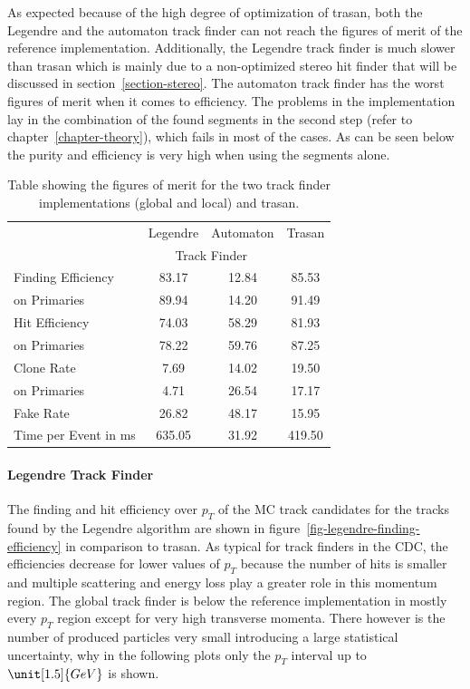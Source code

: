 As expected because of the high degree of optimization of trasan, both the Legendre and the automaton track finder can not reach the figures of merit of the reference implementation. Additionally, the Legendre track finder is much slower than trasan which is mainly due to a non-optimized stereo hit finder that will be discussed in section~\ref{section-stereo}. The automaton track finder has the worst figures of merit when it comes to efficiency. The problems in the implementation lay in the combination of the found segments in the second step (refer to chapter~\ref{chapter-theory}), which fails in most of the cases. As can be seen below the purity and efficiency is very high when using the segments alone.

\begin{table}
  \caption{Table showing the figures of merit for the two track finder implementations (global and local) and trasan.}
  \centering
  \begin{tabular}{lccc} \toprule
    & Legendre & Automaton & Trasan \\ 
    & \multicolumn{2}{c}{Track Finder} & \\ \midrule
    Finding Efficiency & 83.17 & 12.84 & 85.53 \\
    \quad on Primaries & 89.94 & 14.20 & 91.49 \\ 
    Hit Efficiency     & 74.03 & 58.29 & 81.93 \\
    \quad on Primaries & 78.22 & 59.76 & 87.25 \\ 
    Clone Rate         & 7.69  & 14.02 & 19.50 \\
    \quad on Primaries & 4.71  & 26.54 & 17.17 \\ 
    Fake Rate          & 26.82 & 48.17 & 15.95 \\ 
    Time per Event in ms & 635.05 & 31.92 & 419.50 \\ \bottomrule
  \end{tabular}
  \label{tab-old-implementation-results}
\end{table}

\paragraph{Legendre Track Finder}
The finding and hit efficiency over $p_T$ of the MC track candidates for the tracks found by the Legendre algorithm are shown in figure~\ref{fig-legendre-finding-efficiency} in comparison to trasan. As typical for track finders in the CDC, the efficiencies decrease for lower values of $p_T$ because the number of hits is smaller and multiple scattering and energy loss play a greater role in this momentum region. The global track finder is below the reference implementation in mostly every $p_T$ region except for very high transverse momenta. There however is the number of produced particles very small introducing a large statistical uncertainty, why in the following plots only the $p_T$ interval up to $\unit[1.5]{GeV}$ is shown.

